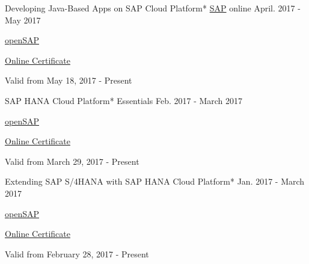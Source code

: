 

\begin{cventries}

  \cventry
    {Developing Java-Based Apps on SAP Cloud Platform*} %
    {\href{https://www.sap.com/index.html}{SAP}} %
    {online} %
    {April. 2017 - May 2017} %
    {
	    \begin{cvitems} %
        \item {\href{https://open.sap.com/}{openSAP}} %
        \item {\href{https://open.sap.com/verify/xuhes-rimus-bikon-roper-hicom}{Online Certificate}} %
        \item {Valid from May 18, 2017 - Present} %
      \end{cvitems}
    }    

  \cventry
    {SAP HANA Cloud Platform* Essentials} %
    {} %
    {} %
    {Feb. 2017 - March 2017} %
    {
	    \begin{cvitems} %
        \item {\href{https://open.sap.com/}{openSAP}} %
        \item {\href{https://open.sap.com/verify/xulor-nynoz-soped-muvuv-zitek}{Online Certificate}} %
        \item {Valid from March 29, 2017 - Present} %
      \end{cvitems}
    }        
    
  \cventry
    {Extending SAP S/4HANA with SAP HANA Cloud Platform*} %
    {} %
    {} %
    {Jan. 2017 - March 2017} %
    {
	    \begin{cvitems} %
        \item {\href{https://open.sap.com/}{openSAP}} %
        \item {\href{https://open.sap.com/verify/xugal-vaseb-firih-zadyd-deniv}{Online Certificate}} %
        \item {Valid from February 28, 2017 - Present} %
      \end{cvitems}
    }
   

\end{cventries}
